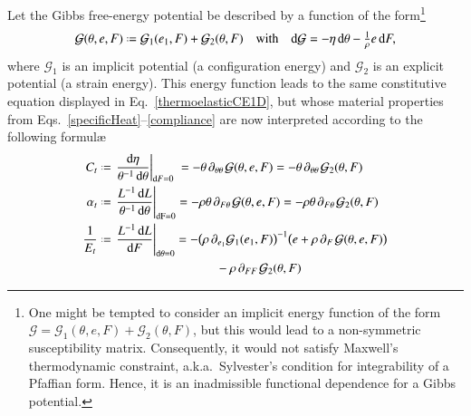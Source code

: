 Let the Gibbs free-energy potential be described by a function of the form\footnote{
    One might be tempted to consider an implicit energy function of the form $\mathcal{G} = \mathcal{G}_1 (\theta ,  e , F ) + \mathcal{G}_2 (\theta , F)$, but this would lead to a non-symmetric susceptibility matrix.  Consequently, it would not satisfy Maxwell's thermo\-dynamic constraint, a.k.a.\ Sylvester's condition for integrability of a Pfaffian form.  Hence, it is an inadmissible functional dependence for a Gibbs potential.
}
\begin{equation}
\mathcal{G} (\theta , e , F) \defeq \mathcal{G}_1 ( e_1 , F ) + \mathcal{G}_2 ( \theta , F )
\quad \text{with} \quad
\mathrm{d} \mathcal{G} = -\eta \, \mathrm{d} \theta - 
\tfrac{1}{\rho} e \, \mathrm{d} F ,
\label{GibbsFreeEnergy}
\end{equation}
where $\mathcal{G}_1$ is an implicit potential (a configuration energy) and $\mathcal{G}_2$ is an explicit potential (a strain energy).  This energy function leads to the same constitutive equation displayed in Eq.~\ref{thermoelasticCE1D}, but whose material properties from Eqs.~\ref{specificHeat}--\ref{compliance} are now interpreted according to the following formul\ae
\begin{subequations}
    \label{physicalFields1Dfiber}
    \begin{align}
    C_t & \defeq 
    \left. \frac{\mathrm{d} \eta}{\theta^{-1} \, \mathrm{d} \theta} 
    \right|_{\mathrm{d}F=0} \; =
    -\theta \, \partial_{\theta\theta\,} \mathcal{G} ( \theta , e , F ) = 
    -\theta \, \partial_{\theta\theta\,} \mathcal{G}_2(\theta , F)
    \label{specificHeat1D} \\
    \alpha_t & \defeq
    \left. \frac{L^{-1} \, \mathrm{d}L}
    {\theta^{-1} \, \mathrm{d}\theta} \right|_{\mathrm{dF=0}} =
    -\rho\theta \, \partial_{F\theta\,} \mathcal{G} (\theta , e , F) =
    -\rho\theta \, \partial_{F\theta\,} \mathcal{G}_2(\theta , F)
    \label{thermalExpansion1D} \\
    \frac{1}{E_t} & \defeq 
    \left. \frac{L^{-1} \, \mathrm{d}L}{\mathrm{d}F}
    \right|_{\mathrm{d}\theta=0} = -
    \bigl( \rho \, \partial_{e_1} \mathcal{G}_1 ( e_1 , F ) \bigr)^{-1} 
    \bigl( e + \rho \, \partial_{F\,} \mathcal{G} (\theta , e , F) \bigr) \notag \\ \mbox{} & \hspace{33mm} -
    \rho \, \partial_{FF\,} \mathcal{G}_2(\theta , F)
    \label{compliance1D}
    \end{align}
\end{subequations}
